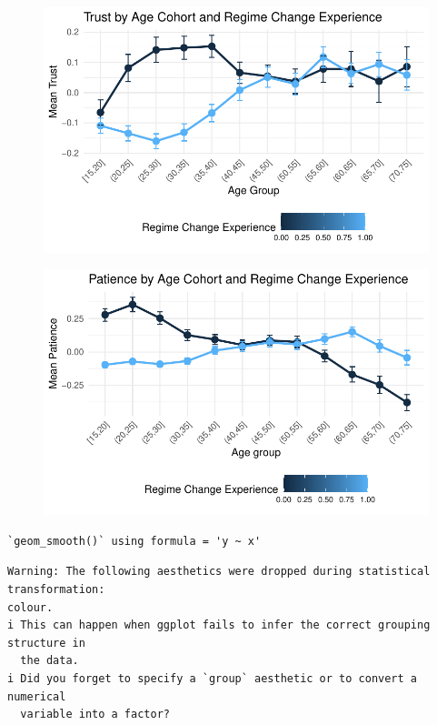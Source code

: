 \documentclass[
  letterpaper,
  DIV=11,
  numbers=noendperiod]{scrartcl}
\begin{document}
\begin{figure}[H]

{\centering \includegraphics{Milestone-2-Data_files/figure-pdf/unnamed-chunk-3-1.pdf}

}

\end{figure}

\begin{figure}[H]

{\centering \includegraphics{Milestone-2-Data_files/figure-pdf/unnamed-chunk-3-2.pdf}

}

\end{figure}

\begin{verbatim}
`geom_smooth()` using formula = 'y ~ x'
\end{verbatim}

\begin{verbatim}
Warning: The following aesthetics were dropped during statistical transformation:
colour.
i This can happen when ggplot fails to infer the correct grouping structure in
  the data.
i Did you forget to specify a `group` aesthetic or to convert a numerical
  variable into a factor?
\end{verbatim}
\end{document}
